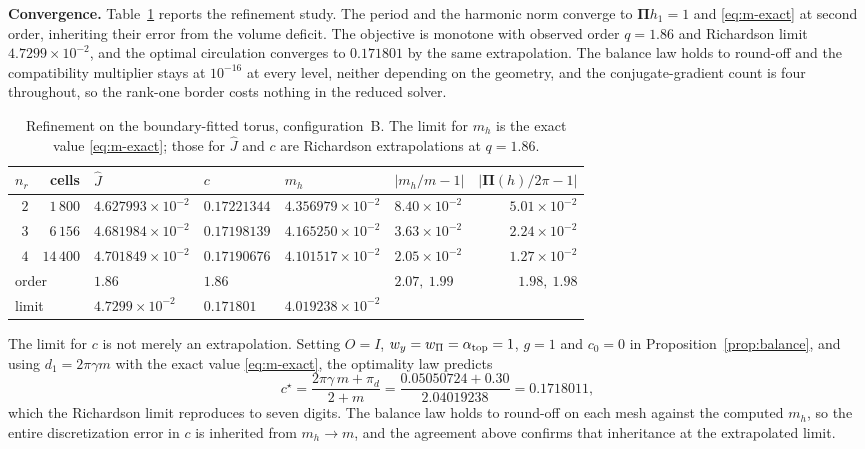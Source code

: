 \documentclass{article}
\newcommand{\Piop}{\boldsymbol\Pi}
\begin{document}
\medskip
\noindent\textbf{Convergence.}
Table~\ref{tab:torus-refine} reports the refinement study. The period and the
harmonic norm converge to $\Piop h_{1}=1$ and \eqref{eq:m-exact} at second
order, inheriting their error from the volume deficit. The objective is
monotone with observed order $q=1.86$ and Richardson limit
$4.7299\times10^{-2}$, and the optimal circulation converges to $0.171801$ by
the same extrapolation. The balance law holds to round-off and the
compatibility multiplier stays at $10^{-16}$ at every level, neither depending
on the geometry, and the conjugate-gradient count is four throughout, so the
rank-one border costs nothing in the reduced solver.

\begin{table}[htbp]
\centering
\begin{tabular}{rrllllr}
\toprule
$n_{r}$ & cells & $\widehat J$ & $c$ & $m_{h}$
 & $|m_{h}/m-1|$ & $|\Piop(h)/2\pi-1|$\\
\midrule
$2$ & $1\,800$  & $4.627993\times10^{-2}$ & $0.17221344$
    & $4.356979\times10^{-2}$ & $8.40\times10^{-2}$
    & $5.01\times10^{-2}$\\
$3$ & $6\,156$  & $4.681984\times10^{-2}$ & $0.17198139$
    & $4.165250\times10^{-2}$ & $3.63\times10^{-2}$
    & $2.24\times10^{-2}$\\
$4$ & $14\,400$ & $4.701849\times10^{-2}$ & $0.17190676$
    & $4.101517\times10^{-2}$ & $2.05\times10^{-2}$
    & $1.27\times10^{-2}$\\
\midrule
\multicolumn{2}{l}{order} & $1.86$ & $1.86$ & & $2.07,\ 1.99$
    & $1.98,\ 1.98$\\
\multicolumn{2}{l}{limit} & $4.7299\times10^{-2}$ & $0.171801$
    & $4.019238\times10^{-2}$ & &\\
\bottomrule
\end{tabular}
\caption{Refinement on the boundary-fitted torus, configuration~B. The limit
for $m_{h}$ is the exact value \eqref{eq:m-exact}; those for $\widehat J$ and
$c$ are Richardson extrapolations at $q=1.86$.}
\label{tab:torus-refine}
\end{table}

The limit for $c$ is not merely an extrapolation. Setting $O=I$,
$w_{y}=w_{\Pi}=\alpha_{\rm top}=1$, $g=1$ and $c_{0}=0$ in
Proposition~\ref{prop:balance}, and using $d_{1}=2\pi\gamma m$ with the exact
value \eqref{eq:m-exact}, the optimality law predicts
\[
  c^{\star}=\frac{2\pi\gamma\,m+\pi_{d}}{2+m}
  =\frac{0.05050724+0.30}{2.04019238}
  =0.1718011 ,
\]
which the Richardson limit reproduces to seven digits. The balance law holds
to round-off on each mesh against the computed $m_{h}$, so the entire
discretization error in $c$ is inherited from $m_{h}\to m$, and the agreement
above confirms that inheritance at the extrapolated limit.
\end{document}
